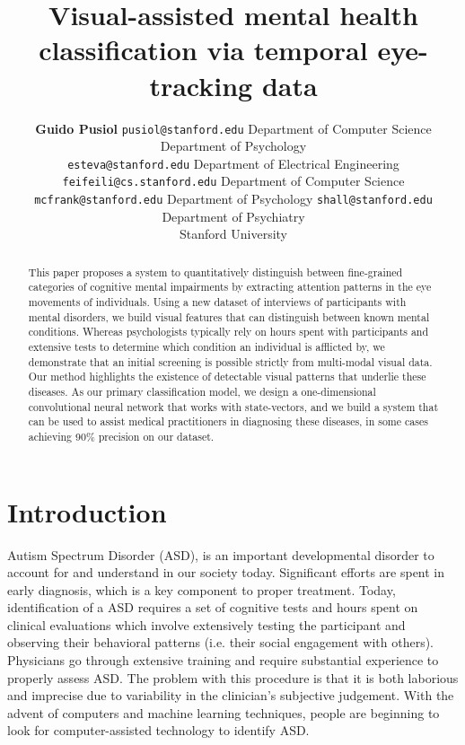 \documentclass[10pt,twocolumn,letterpaper]{article}
\begin{document}
\title{Visual-assisted mental health classification via temporal eye-tracking data}

\author{{\bf Guido Pusiol}
\texttt{pusiol@stanford.edu}
Department of Computer Science\\
Department of Psychology \\
\texttt{esteva@stanford.edu} 
Department of Electrical Engineering
\texttt{feifeili@cs.stanford.edu} 
Department of Computer Science
\texttt{mcfrank@stanford.edu}
Department of Psychology
\texttt{shall@stanford.edu}\\
  Department of Psychiatry\\
Stanford University}
  

\maketitle

\begin{abstract}
This paper proposes a system to quantitatively distinguish between fine-grained categories of cognitive mental impairments by extracting attention patterns in the eye movements of individuals.  
Using a new dataset of interviews of participants with mental disorders, we build visual features that can distinguish between known mental conditions. Whereas psychologists typically rely on hours spent with participants and extensive tests to determine which condition an individual is afflicted by, we demonstrate that an initial screening is possible strictly from multi-modal visual data.
Our method highlights the existence of detectable visual patterns that underlie these diseases. As our primary classification model, we design a one-dimensional convolutional neural network that works with state-vectors, and we build a system that can be used to assist medical practitioners in diagnosing these diseases, in some cases achieving 90\% precision on our dataset.
\end{abstract}
   
\section{Introduction}
   
Autism Spectrum Disorder (ASD), is an important developmental disorder to account for and understand in our society today. Significant efforts are spent in early diagnosis, which is a key component to proper treatment.  Today, identification of a ASD requires a set of cognitive tests and hours spent on clinical evaluations which involve extensively testing the participant and observing their behavioral patterns (i.e. their social engagement with others). Physicians go through extensive training and require substantial experience to properly assess ASD.  The problem with this procedure is that it is both laborious and imprecise due to variability in the clinician's subjective judgement. With the advent of computers and machine learning techniques, people are beginning to look for computer-assisted technology to identify ASD. 
\end{document}
